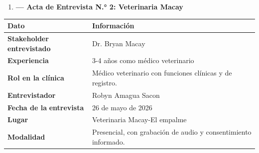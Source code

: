 \documentclass[
]{article}
\newcounter{none} %
\begin{document}
\begin{enumerate}
\def\labelenumi{\arabic{enumi}.}
\setcounter{enumi}{1}
\item
  \textbf{--- Acta de Entrevista N.° 2: Veterinaria Macay}
\end{enumerate}

{\def\LTcaptype{none} %
\begin{longtable}[]{@{}
  >{\raggedright\arraybackslash}p{}
  >{\raggedright\arraybackslash}p{}@{}}
\toprule\noalign{}
\begin{minipage}[b]{\linewidth}\centering
\textbf{Dato}
\end{minipage} & \begin{minipage}[b]{\linewidth}\centering
\textbf{Información}
\end{minipage} \\
\midrule\noalign{}
\endhead
\bottomrule\noalign{}
\endlastfoot
\textbf{Stakeholder} \textbf{entrevistado} & \begin{minipage}[t]{\linewidth}\raggedright
Dr. Bryan Macay
\end{minipage} \\
\textbf{Experiencia} & \begin{minipage}[t]{\linewidth}\raggedright
3-4 años como médico veterinario
\end{minipage} \\
\textbf{Rol en la clínica} & \begin{minipage}[t]{\linewidth}\raggedright
Médico veterinario con funciones clínicas y de registro.
\end{minipage} \\
\textbf{Entrevistador} & \begin{minipage}[t]{\linewidth}\raggedright
Robyn Amagua Sacon
\end{minipage} \\
\textbf{Fecha de la} \textbf{entrevista} & \begin{minipage}[t]{\linewidth}\raggedright
26 de mayo de 2026
\end{minipage} \\
\textbf{Lugar} & \begin{minipage}[t]{\linewidth}\raggedright
Veterinaria Macay-El empalme
\end{minipage} \\
\textbf{Modalidad} & \begin{minipage}[t]{\linewidth}\raggedright
Presencial, con grabación de audio y consentimiento informado.

\end{minipage}
\end{longtable}}
\end{document}
